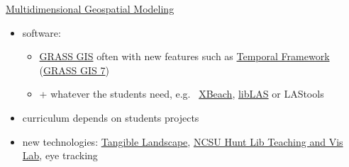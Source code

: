 \documentclass[xcolor={dvipsnames,usenames},beamer,aspectratio=169]{beamer}
\begin{document}
\begin{frame}{\coursesTitle}

\begin{columns}[c]


\begin{block}{\href{http://courses.ncsu.edu/mea592/common/}%
  {Multidimensional Geospatial Modeling}}

\begin{itemize}
 \item software:
 \begin{itemize}
   \item \href{http://grass.osgeo.org}{GRASS GIS}
   {\scriptsize
    often with new features such as
    \href{http://grass.osgeo.org/grass70/manuals/temporalintro.html}{Temporal Framework}
    (\href{http://grass.osgeo.org/grass7/}{GRASS GIS 7})
   }
  \item + whatever the students need, e.g.~%
    \href{http://oss.deltares.nl/web/xbeach/}{XBeach}, \href{http://www.liblas.org/}{libLAS}
    or LAStools
 \end{itemize}

 \item curriculum depends on students projects
 \item new technologies:
   \href{http://geospatial.ncsu.edu/osgeorel/tangible-landscape.html}%
   {Tangible Landscape},
   \href{https://www.lib.ncsu.edu/spaces/teaching-and-visualization-lab}%
           {NCSU Hunt Lib Teaching and Vis Lab},
   eye tracking

\end{itemize}

\end{block}



\end{columns}
\end{frame}
\end{document}
